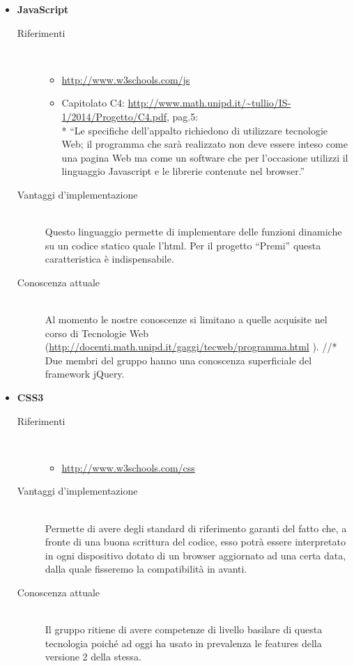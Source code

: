 \begin{itemize}
\begin{description}
	\end{description}
	\item \textbf{JavaScript}
	\begin{description}
		\item[Riferimenti] \hfill \\ 
		\begin{itemize}
			\item \url{http://www.w3schools.com/js}
			\item Capitolato C4: \url{http://www.math.unipd.it/~tullio/IS-1/2014/Progetto/C4.pdf}, pag.5: \\* “Le specifiche dell'appalto richiedono di utilizzare tecnologie Web; il programma che sarà realizzato non deve essere inteso come una pagina Web ma come un software che per l'occasione utilizzi il linguaggio Javascript e le librerie contenute nel browser.”
		\end{itemize}
		\item[Vantaggi d'implementazione] \hfill \\ Questo linguaggio permette di implementare delle funzioni dinamiche su un codice statico quale l’html. Per il progetto “Premi” questa caratteristica è indispensabile.
		\item[Conoscenza attuale] \hfill \\ Al momento le nostre conoscenze si limitano a quelle acquisite nel corso di Tecnologie Web 	(\url{http://docenti.math.unipd.it/gaggi/tecweb/programma.html} ). //* Due membri del gruppo hanno una conoscenza superficiale del framework jQuery.
	\end{description}
	\item \textbf{CSS3}
	\begin{description}
		\item[Riferimenti] \hfill \\
		\begin{itemize}
			\item \url{http://www.w3schools.com/css}
		\end{itemize}
		\item[Vantaggi d'implementazione] \hfill \\ Permette di avere degli standard di riferimento garanti del fatto che, a fronte di una buona scrittura del codice, esso potrà essere interpretato in ogni dispositivo dotato di un browser aggiornato ad una certa data, dalla quale fisseremo la compatibilità in avanti.
		\item[Conoscenza attuale] \hfill \\ Il gruppo ritiene di avere competenze di livello basilare di questa tecnologia poiché ad oggi ha usato in prevalenza le features della versione 2 della stessa.

\end{description}
\end{itemize}
